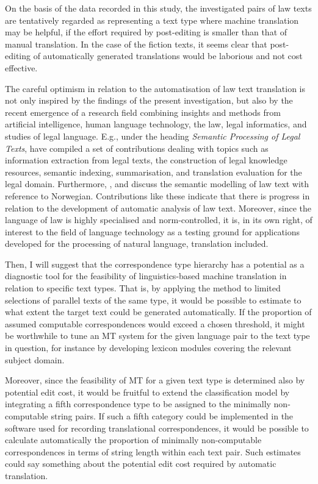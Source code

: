 \documentclass[output=paper]{LSP/langsci}
\begin{document}
On the basis of the data recorded in this study, the investigated pairs of law texts are tentatively regarded as representing a text type where machine translation may be helpful, if the effort required by post-editing is smaller than that of manual translation. In the case of the fiction texts, it seems clear that post-editing of automatically generated translations would be laborious and not cost effective.

The careful optimism in relation to the automatisation of law text translation is not only inspired by the findings of the present investigation, but also by the recent emergence of a research field combining insights and methods from artificial intelligence, human language technology, the law, legal informatics, and studies of legal language. E.g., under the heading \textit{Semantic Processing of Legal Texts}, \citet{FrancesconiEtAl2010} have compiled a set of contributions dealing with topics such as information extraction from legal texts, the construction of legal knowledge resources, semantic indexing, summarisation, and translation evaluation for the legal domain. Furthermore, \citet{Johnsen2010}, and \citet{JohnsenBerre2010} discuss the semantic modelling of law text with reference to Norwegian. Contributions like these indicate that there is progress in relation to the development of automatic analysis of law text. Moreover, since the language of law is highly specialised and norm-controlled, it is, in its own right, of interest to the field of language technology as a testing ground for applications developed for the processing of natural language, translation included.

Then, I will suggest that the correspondence type hierarchy has a potential as a diagnostic tool for the feasibility of linguistics-based machine translation in relation to specific text types. That is, by applying the method to limited selections of parallel texts of the same type, it would be possible to estimate to what extent the target text could be generated automatically. If the proportion of assumed computable correspondences would exceed a chosen threshold, it might be worthwhile to tune an MT system for the given language pair to the text type in question, for instance by developing lexicon modules covering the relevant subject domain.

Moreover, since the feasibility of MT for a given text type is determined also by potential edit cost, it would be fruitful to extend the classification model by integrating a fifth correspondence type to be assigned to the minimally non-computable string pairs. If such a fifth category could be implemented in the software used for recording translational correspondences, it would be possible to calculate automatically the proportion of minimally non-computable correspondences in terms of string length within each text pair. Such estimates could say something about the potential edit cost required by automatic translation. 
\end{document}
